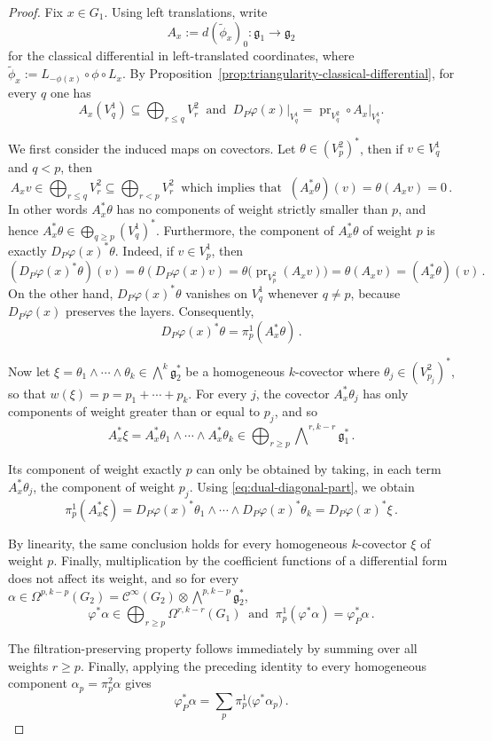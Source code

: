 \documentclass[dvipsnames]{amsart}
\theoremstyle{definition}
\theoremstyle{definition}
\numberwithin{equation}{section}
\newcommand{\C}{\mathcal{C}}
\begin{document}
\begin{proof}
Fix \(x\in G_1\). Using left translations, write
\[
A_x:=d(\widetilde\phi_x)_0:
\mathfrak g_1\longrightarrow\mathfrak g_2
\]
for the classical differential in left-translated coordinates, where $\widetilde\phi_x
:=
L_{-\phi(x)}\circ\phi\circ L_x$.
By Proposition~\ref{prop:triangularity-classical-differential}, for
every \(q\) one has
\[
A_x(V_q^1)\subseteq\bigoplus_{r\leq q}V_r^2\
\text{ and }
\
D_P\varphi(x)\big|_{V_q^1}
=
\operatorname{pr}_{V_q^2}
\circ A_x\big|_{V_q^1}.
\]

We first consider the induced maps on covectors. Let $\theta\in(V_p^2)^\ast$, then if \(v\in V_q^1\) and \(q<p\), then
\[
A_xv\in\bigoplus_{r\leq q}V_r^2
\subseteq
\bigoplus_{r<p}V_r^2\ \text{ which implies that }\ 
(A_x^*\theta)(v)=\theta(A_xv)=0\,.
\]
In other words \(A_x^*\theta\) has no components of weight strictly
smaller than \(p\), and hence $A_x^*\theta
\in
\bigoplus_{q\geq p}(V_q^1)^*$.
Furthermore, the component of \(A_x^*\theta\) of weight \(p\) is
exactly \(D_P\varphi(x)^*\theta\). Indeed, if \(v\in V_p^1\), then
\[
(D_P\varphi(x)^*\theta)(v)
=
\theta(D_P\varphi(x)v)
=
\theta\bigl(\operatorname{pr}_{V_p^2}(A_xv)\bigr)
=
\theta(A_xv)
=
(A_x^*\theta)(v)\,.
\]
On the other hand, \(D_P\varphi(x)^*\theta\) vanishes on \(V_q^1\) whenever
\(q\neq p\), because \(D_P\varphi(x)\) preserves the layers. Consequently,
\begin{equation}
\label{eq:dual-diagonal-part}
D_P\varphi(x)^*\theta
=
\pi_p^1(A_x^*\theta)\,.
\end{equation}

Now let $\xi=\theta_1\wedge\cdots\wedge\theta_k\in\bigwedge^k\mathfrak{g}_2^\ast$
be a homogeneous \(k\)-covector
where $\theta_j\in(V_{p_j}^2)^*$, so that $w(\xi)=
p=p_1+\cdots+p_k$.
For every \(j\), the covector \(A_x^*\theta_j\) has only components of
weight greater than or equal to \(p_j\), and so
\[
A_x^*\xi
=
A_x^*\theta_1\wedge\cdots\wedge A_x^*\theta_k\in\bigoplus_{ r\ge p}\bigwedge\nolimits^{r,k-r}\mathfrak{g}_1^\ast\,.
\]

Its component of weight exactly \(p\) can only be obtained by taking,
in each term \(A_x^*\theta_j\), the component of weight \(p_j\).
Using \eqref{eq:dual-diagonal-part}, we obtain
\[
\pi_p^1(A_x^*\xi)
=
D_P\varphi(x)^*\theta_1\wedge\cdots\wedge D_P\varphi(x)^*\theta_k
=
D_P\varphi(x)^*\xi\,.
\]

By linearity, the same conclusion holds for every homogeneous
\(k\)-covector \(\xi\) of weight \(p\). Finally, multiplication by the
coefficient functions of a differential form does not affect its
weight, and so for every
\(\alpha\in\Omega^{p,k-p}(G_2)=\C^\infty(G_2)\otimes\bigwedge^{p,k-p}\mathfrak{g}_2^\ast\),
\[
\varphi^*\alpha
\in
\bigoplus_{r\geq p}\Omega^{r,k-r}(G_1)\ \text{ and }\
\pi_p^1(\varphi^*\alpha)
=
\varphi_P^*\alpha\,.
\]

The filtration-preserving property follows immediately by summing
over all weights \(r\geq p\). Finally, applying the preceding identity
to every homogeneous component
\(\alpha_p=\pi_p^2\alpha\) gives
\[
\varphi_P^*\alpha
=
\sum_p\pi_p^1\bigl(\varphi^*\alpha_p\bigr)\,.
\]
\end{proof}
\end{document}
